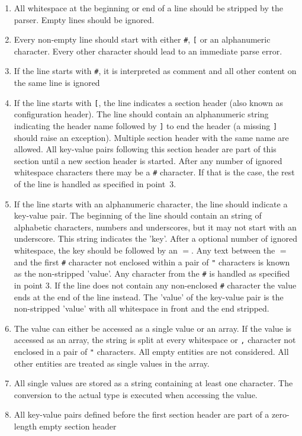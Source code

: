 \begin{enumerate}
\item All whitespace at the beginning or end of a line should be stripped by the parser. Empty lines should be ignored.
\item Every non-empty line should start with either \texttt{\#}, \texttt{[} or an alphanumeric character. Every other character should lead to an immediate parse error.
\item If the line starts with \texttt{\#}, it is interpreted as comment and all other content on the same line is ignored
\item If the line starts with \texttt{[}, the line indicates a section header (also known as configuration header). The line should contain an alphanumeric string indicating the header name followed by \texttt{]} to end the header (a missing \texttt{]} should raise an exception). Multiple section header with the same name are allowed. All key-value pairs following this section header are part of this section until a new section header is started. After any number of ignored whitespace characters there may be a \texttt{\#} character. If that is the case, the rest of the line is handled as specified in point~3.
\item If the line starts with an alphanumeric character, the line should indicate a key-value pair. The beginning of the line should contain an string of alphabetic characters, numbers and underscores, but it may not start with an underscore. This string indicates the 'key'. After a optional number of ignored whitespace, the key should be followed by an \texttt{$=$}. Any text between the \texttt{$=$} and the first \texttt{\#} character not enclosed within a pair of \texttt{"} characters is known as the non-stripped 'value'. Any character from the \texttt{\#} is handled as specified in point 3. If the line does not contain any non-enclosed \texttt{\#} character the value ends at the end of the line instead. The 'value' of the key-value pair is the non-stripped 'value' with all whitespace in front and the end stripped.
\item The value can either be accessed as a single value or an array. If the value is accessed as an array, the string is split at every whitespace or \texttt{,} character not enclosed in a pair of \texttt{"} characters. All empty entities are not considered. All other entities are treated as single values in the array.
\item All single values are stored as a string containing at least one character. The conversion to the actual type is executed when accessing the value.
\item All key-value pairs defined before the first section header are part of a zero-length empty section header
\end{enumerate}


